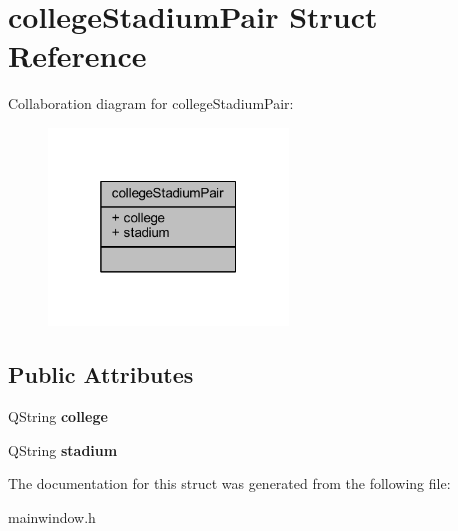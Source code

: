 \hypertarget{structcollege_stadium_pair}{}\section{college\+Stadium\+Pair Struct Reference}
\label{structcollege_stadium_pair}


Collaboration diagram for college\+Stadium\+Pair\+:\nopagebreak
\begin{figure}[H]
\begin{center}
\leavevmode
\includegraphics[width=181pt]{structcollege_stadium_pair__coll__graph}
\end{center}
\end{figure}
\subsection*{Public Attributes}
\begin{DoxyCompactItemize}
\item 
\mbox{\label{structcollege_stadium_pair_a77ca4473825d5cd624b735a458b307bb}} 
Q\+String {\bfseries college}
\item 
\mbox{\label{structcollege_stadium_pair_a670f797a70b4d32b10c49414aada09ee}} 
Q\+String {\bfseries stadium}
\end{DoxyCompactItemize}


The documentation for this struct was generated from the following file\+:\begin{DoxyCompactItemize}
\item 
mainwindow.\+h\end{DoxyCompactItemize}
